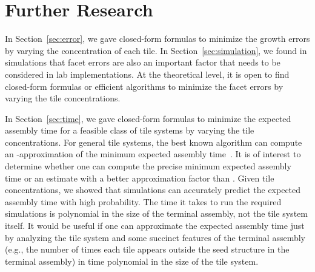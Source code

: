\documentclass[11pt]{article}
\begin{document}
\section{Further Research}
\label{sec:conclusion}


In Section~\ref{sec:error}, we gave closed-form formulas to minimize the growth errors by varying the concentration of each tile. In Section~\ref{sec:simulation}, we found in simulations that facet errors are also an important factor that needs to be considered in lab implementations. At the theoretical level, it is open to find closed-form formulas or efficient algorithms to minimize the facet errors by varying the tile concentrations.

In Section~\ref{sec:time}, we gave closed-form formulas to minimize the expected assembly time for a feasible class of tile systems by varying the tile concentrations. For general tile systems, the best known algorithm  can compute an -approximation of the minimum expected assembly time~\cite{acghkmr02:opt}. It is of interest to determine whether one can compute the precise minimum expected assembly time or an estimate with a better approximation factor than . Given tile concentrations, we showed that simulations can accurately predict the expected assembly time with high probability. The time it takes to run the required simulations is polynomial in the size of the terminal assembly, not the tile system itself. It would be useful if one can approximate the expected assembly time just by analyzing the tile system and some succinct features of the terminal assembly (e.g., the number of times each tile appears outside the seed structure in the terminal assembly) in time polynomial in the size of the tile system.




\end{document}
